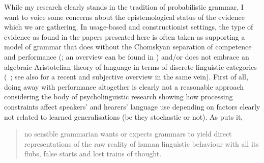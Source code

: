 While my research clearly stands in the tradition of probabilistic grammar, I want to voice some concerns about the epistemological status of the evidence which we are gathering.
In usage-based and constructionist settings, the type of evidence as found in the papers presented here is often taken as supporting a model of grammar that does without the Chomskyan separation of competence and performance (\citealt{Chomsky1965}; an overview can be found in \citealt[507--518]{Mueller2018}) and\slash or does not embrace an algebraic Aristotelian theory of language in terms of discrete linguistic categories (\eg\ \citealt{Manning2002,Bod2006}; see also \citealt{Kapatsinski2014} for a recent and subjective overview in the same vein).
First of all, doing away with performance altogether is clearly not a reasonable approach considering the body of psycholinguistic research showing how processing constraints affect speakers' and hearers' language use depending on factors clearly not related to learned generalisations (be they stochastic or not).
As \citet[532]{Pullum2013a} puts it,

\begin{quote}
  no sensible grammarian wants or expects grammars to yield direct representations of the raw reality of human linguistic behaviour with all its flubs, false starts and lost trains of thought.
\end{quote}

